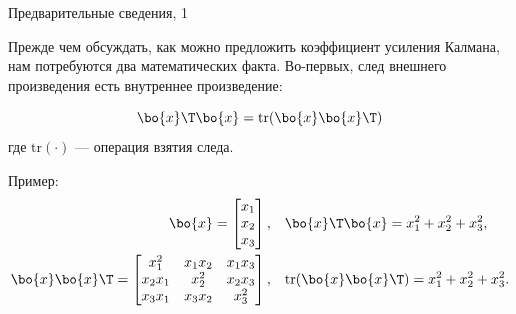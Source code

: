 \documentclass{beamer}
\begin{document}
\begin{frame}{Предварительные сведения, 1}
	\begin{flushleft}
		
		Прежде чем обсуждать, как можно предложить коэффициент усиления Калмана, нам потребуются два математических факта. Во-первых, след внешнего произведения есть внутреннее произведение:
		
		\begin{equation}
			\bo{x}\T \bo{x} = \text{tr}(\bo{x}\bo{x}\T)
		\end{equation}
		где $\text{tr}(\cdot)$ — операция взятия следа.
		
		\bigskip
		
		Пример:
		\begin{align*}
			\bo{x} = 
			\begin{bmatrix}
				x_1 \\ x_2 \\ x_3
			\end{bmatrix},& 
			\ \ \ 
			\bo{x}\T \bo{x} = x_1^2+x_2^2+x_3^2, 
			\\
			\bo{x}\bo{x}\T = 
			\begin{bmatrix}
				x_1^2    & x_1 x_2 & x_1 x_3 \\ 
				x_2 x_1 & x_2^2    & x_2 x_3 \\ 
				x_3 x_1 & x_3 x_2 & x_3^2
			\end{bmatrix},& 
			\ \ \
			\text{tr}(\bo{x}\bo{x}\T)  = x_1^2+x_2^2+x_3^2.
		\end{align*}	
		
	\end{flushleft}
\end{frame}
\end{document}
